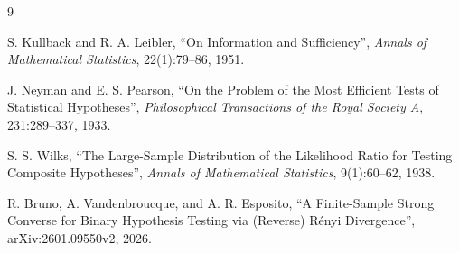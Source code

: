 \documentclass[11pt]{article}
\begin{document}
\begin{thebibliography}{9}

S. Kullback and R. A. Leibler,
``On Information and Sufficiency'',
\emph{Annals of Mathematical Statistics}, 22(1):79--86, 1951.

J. Neyman and E. S. Pearson,
``On the Problem of the Most Efficient Tests of Statistical Hypotheses'',
\emph{Philosophical Transactions of the Royal Society A}, 231:289--337, 1933.

S. S. Wilks,
``The Large-Sample Distribution of the Likelihood Ratio for Testing Composite Hypotheses'',
\emph{Annals of Mathematical Statistics}, 9(1):60--62, 1938.

R. Bruno, A. Vandenbroucque, and A. R. Esposito,
``A Finite-Sample Strong Converse for Binary Hypothesis Testing via (Reverse) Rényi Divergence'',
arXiv:2601.09550v2, 2026.

\end{thebibliography}
\end{document}
